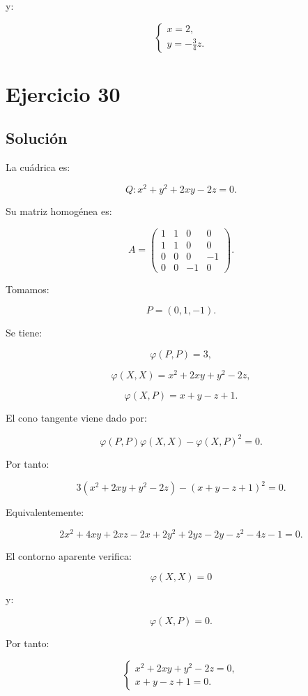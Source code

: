\documentclass[11pt,a4paper]{article}
\begin{document}
y:

\[
\boxed{
\begin{cases}
x=2,\\
y=-\frac34z.
\end{cases}
}
\]

\section{Ejercicio 30}
\subsection{Solución}

La cuádrica es:

\[
Q:
x^2+y^2+2xy-2z=0.
\]

Su matriz homogénea es:

\[
A=
\begin{pmatrix}
1&1&0&0\\
1&1&0&0\\
0&0&0&-1\\
0&0&-1&0
\end{pmatrix}.
\]

Tomamos:

\[
P=(0,1,-1).
\]

Se tiene:

\[
\varphi(P,P)=3,
\]

\[
\varphi(X,X)
=
x^2+2xy+y^2-2z,
\]

\[
\varphi(X,P)
=
x+y-z+1.
\]

El cono tangente viene dado por:

\[
\varphi(P,P)\varphi(X,X)
-
\varphi(X,P)^2
=
0.
\]

Por tanto:

\[
\boxed{
3(x^2+2xy+y^2-2z)
-
(x+y-z+1)^2
=
0.
}
\]

Equivalentemente:

\[
\boxed{
2x^2+4xy+2xz-2x
+
2y^2+2yz-2y
-z^2-4z-1
=
0.
}
\]

El contorno aparente verifica:

\[
\varphi(X,X)=0
\]

y:

\[
\varphi(X,P)=0.
\]

Por tanto:

\[
\boxed{
\begin{cases}
x^2+2xy+y^2-2z=0,\\
x+y-z+1=0.
\end{cases}
}
\]
\end{document}
